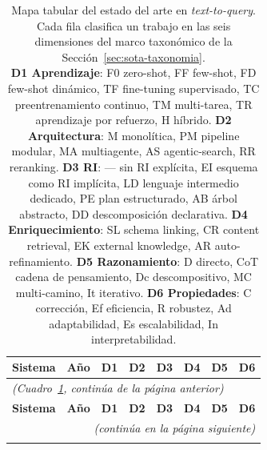 \renewcommand{\arraystretch}{1.1}
{\scriptsize
\begin{longtable}{@{}llcccccc@{}}
\caption{Mapa tabular del estado del arte en \emph{text-to-query}. Cada fila clasifica un trabajo en las seis dimensiones del marco taxonómico de la Sección~\ref{sec:sota-taxonomia}.\protect\\
\textbf{D1 Aprendizaje}: F0 zero-shot, FF few-shot, FD few-shot dinámico, TF fine-tuning supervisado, TC preentrenamiento continuo, TM multi-tarea, TR aprendizaje por refuerzo, H híbrido. \textbf{D2 Arquitectura}: M monolítica, PM pipeline modular, MA multiagente, AS agentic-search, RR reranking. \textbf{D3 RI}: --- sin RI explícita, EI esquema como RI implícita, LD lenguaje intermedio dedicado, PE plan estructurado, AB árbol abstracto, DD descomposición declarativa. \textbf{D4 Enriquecimiento}: SL schema linking, CR content retrieval, EK external knowledge, AR auto-refinamiento. \textbf{D5 Razonamiento}: D directo, CoT cadena de pensamiento, Dc descompositivo, MC multi-camino, It iterativo. \textbf{D6 Propiedades}: C corrección, Ef eficiencia, R robustez, Ad adaptabilidad, Es escalabilidad, In interpretabilidad.}
\label{tab:sota-mapa}\\
\toprule
\textbf{Sistema} & \textbf{Año} & \textbf{D1} & \textbf{D2} & \textbf{D3} & \textbf{D4} & \textbf{D5} & \textbf{D6} \\
\midrule
\endfirsthead

\multicolumn{8}{l}{\emph{(Cuadro~\ref{tab:sota-mapa}, continúa de la página anterior)}}\\
\toprule
\textbf{Sistema} & \textbf{Año} & \textbf{D1} & \textbf{D2} & \textbf{D3} & \textbf{D4} & \textbf{D5} & \textbf{D6} \\
\midrule
\endhead

\midrule
\multicolumn{8}{r}{\emph{(continúa en la página siguiente)}}\\
\endfoot

\bottomrule
\endlastfoot


\end{longtable}}

